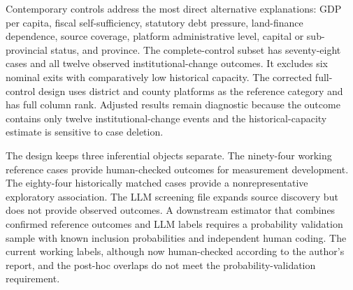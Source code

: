Contemporary controls address the most direct alternative explanations: GDP
per capita, fiscal self-sufficiency, statutory debt pressure, land-finance
dependence, source coverage, platform administrative level, capital or
sub-provincial status, and province. The complete-control subset has
seventy-eight cases and all twelve observed institutional-change outcomes. It
excludes six nominal exits with comparatively low historical capacity. The
corrected full-control design uses district and county platforms as the
reference category and has full column rank. Adjusted results remain diagnostic
because the outcome contains only twelve institutional-change events and the
historical-capacity estimate is sensitive to case deletion.

The design keeps three inferential objects separate. The ninety-four working
reference cases provide human-checked outcomes for measurement development. The
eighty-four historically matched cases provide a nonrepresentative exploratory
association. The LLM screening file expands source discovery but does not
provide observed outcomes. A downstream estimator that combines confirmed
reference outcomes and LLM labels requires a probability validation sample with
known inclusion probabilities and independent human coding. The current working
labels, although now human-checked according to the author's report, and the
post-hoc overlaps do not meet the probability-validation requirement.
